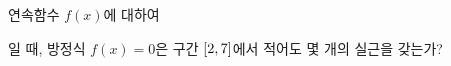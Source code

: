 연속함수 $f(x)$에 대하여\par\smallskip{}\par\smallskip\noindent 일 때, 방정식 $f(x)=0$은 구간 $[2{,}\mkern3mu\mathopen{}7]$에서 적어도 몇 개의 실근을 갖는가?

